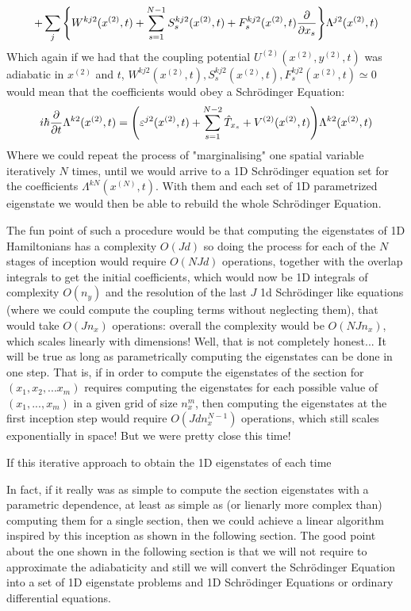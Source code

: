 \documentclass[11pt, a4paper]{article} %
\begin{document}
$$
+\sum_j \qty{ W^{kj2}(x^{(2)},t) + \sum_{s=1}^{N-1} S^{kj2}_s(x^{(2)},t)+F^{kj2}_s(x^{(2)},t)\pdv{}{x_s} } \Lambda^{j2}(x^{(2)},t) 
$$
Which again if we had that the coupling potential $U^{(2)}(x^{(2)}, y^{(2)},t)$ was adiabatic in $x^{(2)}$ and $t$, $W^{kj2}(x^{(2)},t),S^{kj2}_s(x^{(2)},t),F^{kj2}_s(x^{(2)},t)\simeq 0$ would mean that the coefficients would obey a Schrödinger Equation:
\begin{equation}\label{incept2}
i\hbar \pdv{}{t}\Lambda^{k2}(x^{(2)},t)  = \qty( \varepsilon^{j2}(x^{(2)},t) + \sum_{s=1}^{N-2}\hat{T}_{x_s} +V^{(2)}(x^{(2)},t))\Lambda^{k2}(x^{(2)},t)
\end{equation}
Where we could repeat the process of "marginalising" one spatial variable iteratively $N$ times, until we would arrive to a 1D Schrödinger equation set for the coefficients $\Lambda^{kN}(x^{(N)},t)$. With them and each set of 1D parametrized eigenstate we would then be able to rebuild the whole Schrödinger Equation.

The fun point of such a procedure would be that computing the eigenstates of 1D Hamiltonians has a complexity $O(Jd)$ so doing the process for each of the $N$ stages of inception would require $O(NJd)$ operations, together with the overlap integrals to get the initial coefficients, which would now be 1D integrals of complexity $O(n_y)$ and the resolution of the last $J$ 1d Schrödinger like equations (where we could compute the coupling terms without neglecting them), that would take $O(Jn_x)$ operations: overall the complexity would be $O(NJn_x)$, which scales linearly with dimensions! Well, that is not completely honest... It will be true as long as parametrically computing the eigenstates can be done in one step. That is, if in order to compute the eigenstates of the section for $(x_1,x_2,...x_m)$ requires computing the eigenstates for each possible value of $(x_1,...,x_m)$ in a given grid of size $n_x^m$, then computing the eigenstates at the first inception step would require $O(Jdn_x^{N-1})$ operations, which still scales exponentially in space! But we were pretty close this time!

If this iterative approach to obtain the 1D eigenstates of each time 

In fact, if it really was as simple to compute the section eigenstates with a parametric dependence, at least as simple as (or lienarly more complex than) computing them for a single section, then we could achieve a linear algorithm inspired by this inception as shown in the following section. The good point about the one shown in the following section is that we will not require to approximate the adiabaticity and still we will convert the Schrödinger Equation into a set of 1D eigenstate problems and 1D Schrödinger Equations or ordinary differential equations.
\newpage
\end{document}
